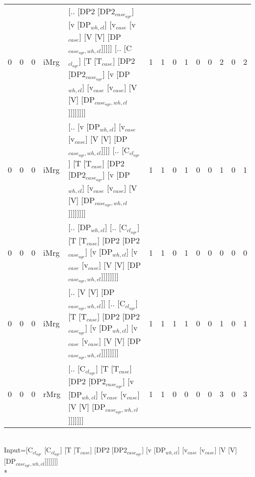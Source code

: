 \begin{tabularx}{\linewidth}{rrrlXrrrrrrrrr}
   0 &       0 &   0 & iMrg & [.. [DP2 [DP2$_{case_{agr}}$] [v [DP$_{wh,cl}$] [v$_{case}$ [v$_{case}$] [V [V] [DP$_{case_{agr},wh,cl}$]]]]] [.. [C$_{cl_{agr}}$] [T [T$_{case}$] [DP2 [DP2$_{case_{agr}}$] [v [DP$_{wh,cl}$] [v$_{case}$ [v$_{case}$] [V [V] [DP$_{case_{agr},wh,cl}$]]]]]]]]              &             1 &             1 &                  0 &            1 &              0 &              0 &        2 &             0 &        2 \\
   0 &       0 &   0 & iMrg & [.. [v [DP$_{wh,cl}$] [v$_{case}$ [v$_{case}$] [V [V] [DP$_{case_{agr},wh,cl}$]]]] [.. [C$_{cl_{agr}}$] [T [T$_{case}$] [DP2 [DP2$_{case_{agr}}$] [v [DP$_{wh,cl}$] [v$_{case}$ [v$_{case}$] [V [V] [DP$_{case_{agr},wh,cl}$]]]]]]]]                                   &             1 &             1 &                  0 &            1 &              0 &              0 &        1 &             0 &        1 \\
   0 &       0 &   0 & iMrg & [.. [DP$_{wh,cl}$] [.. [C$_{cl_{agr}}$] [T [T$_{case}$] [DP2 [DP2$_{case_{agr}}$] [v [DP$_{wh,cl}$] [v$_{case}$ [v$_{case}$] [V [V] [DP$_{case_{agr},wh,cl}$]]]]]]]]                                                                                     &             1 &             1 &                  0 &            1 &              0 &              0 &        0 &             0 &        0 \\
   0 &       0 &   0 & iMrg & [.. [V [V] [DP$_{case_{agr},wh,cl}$]] [.. [C$_{cl_{agr}}$] [T [T$_{case}$] [DP2 [DP2$_{case_{agr}}$] [v [DP$_{wh,cl}$] [v$_{case}$ [v$_{case}$] [V [V] [DP$_{case_{agr},wh,cl}$]]]]]]]]                                                                    &             1 &             1 &                  1 &            1 &              0 &              0 &        1 &             0 &        1 \\
   0 &       0 &   0 & rMrg & [.. [C$_{cl_{agr}}$] [T [T$_{case}$] [DP2 [DP2$_{case_{agr}}$] [v [DP$_{wh,cl}$] [v$_{case}$ [v$_{case}$] [V [V] [DP$_{case_{agr},wh,cl}$]]]]]]]                                                                                                     &             1 &             1 &                  0 &            0 &              0 &              0 &        3 &             0 &        3 \\
\hline
\end{tabularx}\endgroup\\
\begingroup\scriptsize Input=[C$_{cl_{agr}}$ [C$_{cl_{agr}}$] [T [T$_{case}$] [DP2 [DP2$_{case_{agr}}$] [v [DP$_{wh,cl}$] [v$_{case}$ [v$_{case}$] [V [V] [DP$_{case_{agr},wh,cl}$]]]]]]]\\*
